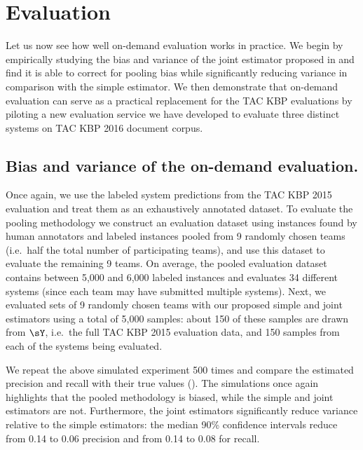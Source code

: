\section{Evaluation}
\label{sec:evaluation}


Let us now see how well on-demand evaluation works in practice.
We begin by empirically studying the bias and variance of the joint estimator proposed in  and find it is able to correct for pooling bias while significantly reducing variance in comparison with the simple estimator.
We then demonstrate that on-demand evaluation can serve as a practical replacement for the TAC KBP evaluations by piloting a new evaluation service we have developed to evaluate three distinct systems on TAC KBP 2016 document corpus.

\subsection{Bias and variance of the on-demand evaluation.}
Once again, we use the labeled system predictions from the TAC KBP 2015 evaluation and treat them as an exhaustively annotated dataset.
To evaluate the pooling methodology we construct an evaluation dataset using
instances found by human annotators and labeled instances pooled from 9
randomly chosen teams (i.e.\ half the total number of participating teams), and
use this dataset to evaluate the remaining 9 teams.
On average, the pooled evaluation dataset contains between 5,000 and 6,000 labeled instances and evaluates 34 different systems (since each team may have submitted multiple systems).
Next, we evaluated sets of 9 randomly chosen teams with our proposed simple and joint estimators using a total of 5,000 samples:
about 150 of these samples are drawn from $\sY$, i.e.\ the full TAC KBP 2015 evaluation data, and 150 samples from each of the systems being evaluated.

We repeat the above simulated experiment 500 times and compare the estimated precision and recall with their true values ().
The simulations once again highlights that the pooled methodology is biased, while the simple and joint estimators are not.
Furthermore, the joint estimators significantly reduce variance relative to the simple estimators:
the median 90\% confidence intervals reduce from 0.14 to 0.06 precision and from 0.14 to 0.08 for recall.

